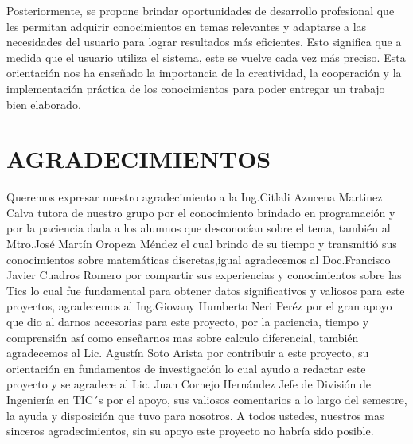 \documentclass{IEEEcsmag}
\begin{document}
Posteriormente, se propone brindar oportunidades de desarrollo profesional que les permitan adquirir conocimientos en temas relevantes y adaptarse a las necesidades del usuario para lograr resultados más eficientes. Esto significa que a medida que el usuario utiliza el sistema, este se vuelve cada vez más preciso. Esta orientación nos ha enseñado la importancia de la creatividad, la cooperación y la implementación práctica de los conocimientos para poder entregar un trabajo bien elaborado.
\vspace*{-8pt}


\section{AGRADECIMIENTOS}
Queremos expresar nuestro agradecimiento a la Ing.Citlali Azucena Martinez Calva tutora de nuestro grupo por el conocimiento brindado en programación y por la paciencia dada a los alumnos que desconocían sobre el tema, también al Mtro.José Martín Oropeza Méndez el cual brindo de su tiempo y transmitió sus conocimientos sobre matemáticas discretas,igual agradecemos al Doc.Francisco Javier Cuadros Romero por compartir sus experiencias y conocimientos sobre las Tics lo cual fue fundamental para obtener datos significativos y valiosos para este proyectos, agradecemos al Ing.Giovany Humberto Neri Peréz por el gran apoyo que dio al darnos accesorias para este proyecto, por la paciencia, tiempo y comprensión así como enseñarnos mas sobre calculo diferencial, también agradecemos al Lic. Agustín Soto Arista por contribuir a este proyecto, su orientación en fundamentos de investigación lo cual ayudo a redactar este proyecto y se agradece al Lic. Juan Cornejo Hernández Jefe de División de Ingeniería en TIC´s por el apoyo, sus valiosos comentarios a lo largo del semestre, la ayuda y disposición que tuvo para nosotros.
A todos ustedes, nuestros mas sinceros agradecimientos, sin su apoyo este proyecto no habría sido posible.


\def\refname{Referencias}
\end{document}

